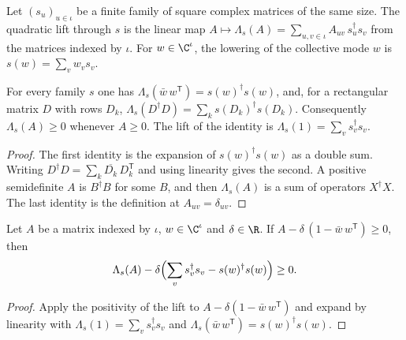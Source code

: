 \begin{definition}
    \label{def:hardcore_quadratic_lift}
    \leanok
    Let $(s_u)_{u\in\iota}$ be a finite family of square complex matrices of the same
    size. The quadratic lift through $s$ is the linear map
    $A\mapsto\Lambda_s(A)=\sum_{u,v\in\iota}A_{uv}\,s_u^\dagger s_v$ from the matrices
    indexed by $\iota$. For $w\in\C^\iota$, the lowering of the collective mode $w$ is
    $s(w)=\sum_vw_vs_v$.
\end{definition}

\begin{theorem}
    \label{thm:hardcore_quadratic_lift_positive}
    \leanok
    For every family $s$ one has $\Lambda_s(\bar w\,w^{\mathsf T})=s(w)^\dagger s(w)$,
    and, for a rectangular matrix $D$ with rows $D_k$,
    $\Lambda_s(D^\dagger D)=\sum_ks(D_k)^\dagger s(D_k)$. Consequently
    $\Lambda_s(A)\ge0$ whenever $A\ge0$. The lift of the identity is
    $\Lambda_s(1)=\sum_vs_v^\dagger s_v$.
\end{theorem}
\begin{proof}\leanok
    The first identity is the expansion of $s(w)^\dagger s(w)$ as a double sum. Writing
    $D^\dagger D=\sum_k\overline{D_k}\,D_k^{\mathsf T}$ and using linearity gives the
    second. A positive semidefinite $A$ is $B^\dagger B$ for some $B$, and then
    $\Lambda_s(A)$ is a sum of operators $X^\dagger X$. The last identity is the
    definition at $A_{uv}=\delta_{uv}$.
\end{proof}

\begin{theorem}
    \label{thm:hardcore_quadratic_lift_gap}
    \leanok
    Let $A$ be a matrix indexed by $\iota$, $w\in\C^\iota$ and $\delta\in\R$. If
    $A-\delta\,(1-\bar w\,w^{\mathsf T})\ge0$, then
    \begin{align*}
        \Lambda_s(A)-\delta\Bigl(\sum_vs_v^\dagger s_v-s(w)^\dagger s(w)\Bigr)\ge0 .
    \end{align*}
\end{theorem}
\begin{proof}\leanok
    Apply the positivity of the lift to $A-\delta(1-\bar w\,w^{\mathsf T})$ and expand by
    linearity with $\Lambda_s(1)=\sum_vs_v^\dagger s_v$ and
    $\Lambda_s(\bar w\,w^{\mathsf T})=s(w)^\dagger s(w)$.
\end{proof}

